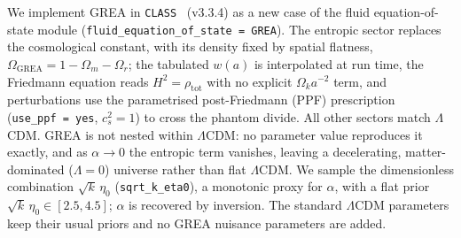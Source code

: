 \documentclass[aps,prd,reprint,superscriptaddress,nofootinbib,longbibliography]{revtex4-2}
\begin{document}
We implement GREA in \texttt{CLASS}~\cite{Blas:2011rf} (v3.3.4) as a new case of the fluid
equation-of-state module (\texttt{fluid\_equation\_of\_state\,=\,GREA}). The entropic
sector replaces the cosmological constant, with its density fixed by spatial flatness,
$\Omega_{\mathrm{GREA}} = 1 - \Omega_m - \Omega_r$; the tabulated $w(a)$ is interpolated at
run time, the Friedmann equation reads $H^2 = \rho_{\mathrm{tot}}$ with no explicit
$\Omega_k a^{-2}$ term, and perturbations use the parametrised post-Friedmann (PPF)
prescription~\cite{Fang:2008sn} (\texttt{use\_ppf\,=\,yes}, $c_s^2 = 1$) to cross the
phantom divide. All other sectors match $\Lambda$CDM. GREA is not nested within
$\Lambda$CDM: no parameter value reproduces it exactly, and as $\alpha \to 0$ the entropic
term vanishes, leaving a decelerating, matter-dominated ($\Lambda = 0$) universe rather
than flat $\Lambda$CDM. We sample the dimensionless combination $\sqrt{k}\,\eta_0$
(\texttt{sqrt\_k\_eta0}), a monotonic proxy for $\alpha$, with a flat prior
$\sqrt{k}\,\eta_0 \in [2.5, 4.5]$; $\alpha$ is recovered by inversion. The standard
$\Lambda$CDM parameters keep their usual priors and no GREA nuisance parameters are added.


\end{document}
